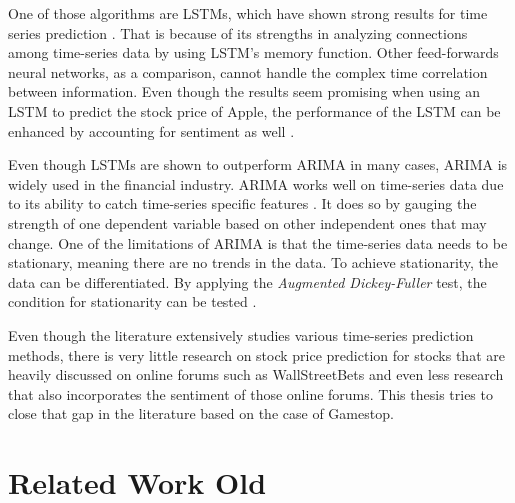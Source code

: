 \documentclass[11pt, a4paper]{article}
\begin{document}
One of those algorithms are LSTMs, which have shown strong results for time series prediction \citep{rammurthy2021lstm}. That is because of its strengths in 
analyzing connections among time-series data by using LSTM's memory function. Other feed-forwards neural networks, as a comparison, cannot handle the complex 
time correlation between information. Even though the results seem promising when using an LSTM to predict the stock price of Apple, the performance of the LSTM 
can be enhanced by accounting for sentiment as well \citep{jin2020lstmsentiment}.

Even though LSTMs are shown to outperform ARIMA in many cases, ARIMA is widely used in the financial industry. ARIMA works well on time-series data due to its
ability to catch time-series specific features \citep{vuong2021forecasting}. It does so by gauging the strength of one dependent variable based on other independent
ones that may change. One of the limitations of ARIMA is that the time-series data needs to be stationary, meaning there are no trends in the data. To achieve
stationarity, the data can be differentiated. By applying the \emph{Augmented Dickey-Fuller} test, the condition for stationarity can be tested \citep{ivanovic2013arima}.

Even though the literature extensively studies various time-series prediction methods, there is very little research on stock price prediction for stocks that are heavily discussed on
online forums such as WallStreetBets and even less research that also incorporates the sentiment of those online forums. This thesis tries to close that gap in the literature based
on the case of Gamestop.


\section{Related Work Old}
\end{document}
